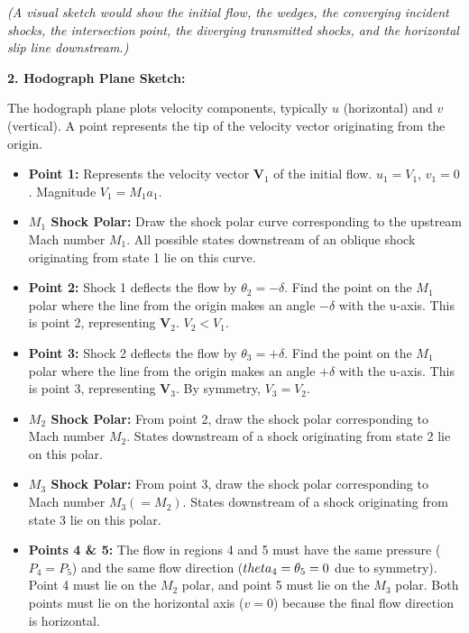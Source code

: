 \emph{(A visual sketch would show the initial flow, the wedges, the
converging incident shocks, the intersection point, the diverging
transmitted shocks, and the horizontal slip line downstream.)}

\textbf{2. Hodograph Plane Sketch:}

The hodograph plane plots velocity components, typically \(u\)
(horizontal) and \(v\) (vertical). A point represents the tip of the
velocity vector originating from the origin.

\begin{itemize}
\tightlist
\item
  \textbf{Point 1:} Represents the velocity vector \(\mathbf{V}_1\) of
  the initial flow. \(u_1 = V_1\), \(v_1 = 0\). Magnitude
  \(V_1 = M_1 a_1\).
\item
  \textbf{\(M_1\) Shock Polar:} Draw the shock polar curve corresponding
  to the upstream Mach number \(M_1\). All possible states downstream of
  an oblique shock originating from state 1 lie on this curve.
\item
  \textbf{Point 2:} Shock 1 deflects the flow by \(\theta_2 = -\delta\).
  Find the point on the \(M_1\) polar where the line from the origin
  makes an angle \(-\delta\) with the u-axis. This is point 2,
  representing \(\mathbf{V}_2\). \(V_2 < V_1\).
\item
  \textbf{Point 3:} Shock 2 deflects the flow by \(\theta_3 = +\delta\).
  Find the point on the \(M_1\) polar where the line from the origin
  makes an angle \(+\delta\) with the u-axis. This is point 3,
  representing \(\mathbf{V}_3\). By symmetry, \(V_3 = V_2\).
\item
  \textbf{\(M_2\) Shock Polar:} From point 2, draw the shock polar
  corresponding to Mach number \(M_2\). States downstream of a shock
  originating from state 2 lie on this polar.
\item
  \textbf{\(M_3\) Shock Polar:} From point 3, draw the shock polar
  corresponding to Mach number \(M_3 (=M_2)\). States downstream of a
  shock originating from state 3 lie on this polar.
\item
  \textbf{Points 4 \& 5:} The flow in regions 4 and 5 must have the same
  pressure (\(P_4=P_5\)) and the same flow direction
  (\(\\theta_4 = \theta_5 = 0\) due to symmetry). Point 4 must lie on
  the \(M_2\) polar, and point 5 must lie on the \(M_3\) polar. Both
  points must lie on the horizontal axis (\(v=0\)) because the final
  flow direction is horizontal.


\end{itemize}
